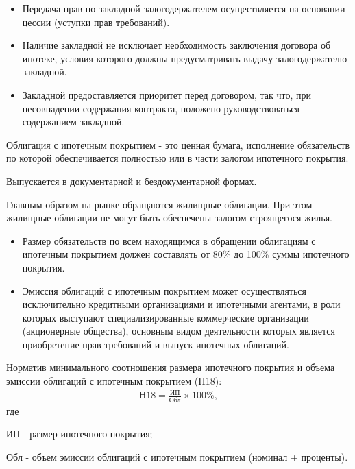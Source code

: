 \documentclass[_Banking_p2.tex]{subfiles}
\begin{document}
\begin{frame}
\begin{itemize}[<+->]
\item
Передача прав по закладной залогодержателем осуществляется на основании цессии (уступки прав требований). 

\item
Наличие закладной не исключает необходимость заключения договора об ипотеке, условия которого должны предусматривать выдачу залогодержателю закладной. 

\item
Закладной предоставляется приоритет перед договором, так что, при несовпадении содержания контракта, положено руководствоваться содержанием закладной.
\end{itemize}
\end{frame}

\begin{frame}{}
\begin{block}{Облигация с ипотечным покрытием }
\quad
- это ценная бумага, исполнение обязательств по которой обеспечивается полностью или в части залогом ипотечного покрытия. 

Выпускается в документарной и бездокументарной формах. 
\end{block}
Главным образом на рынке обращаются жилищные облигации. При этом жилищные облигации не могут быть обеспечены залогом строящегося жилья.
\end{frame}

\begin{frame}
\begin{itemize}[<+->]
\item
Размер обязательств по всем находящимся в обращении облигациям с ипотечным покрытием должен составлять от 80\% до 100\% суммы ипотечного покрытия.
\item
Эмиссия облигаций с ипотечным покрытием может осуществляться исключительно кредитными организациями и ипотечными агентами, в роли которых выступают специализированные коммерческие организации (акционерные общества), основным видом деятельности которых является приобретение прав требований и выпуск ипотечных облигаций. 
\end{itemize}
\end{frame}

\begin{frame}{}
Норматив минимального соотношения размера ипотечного покрытия и объема эмиссии облигаций с ипотечным покрытием (H18):
\begin{align}
\text{Н18}=\frac{\text{ИП}}{\text{Обл}}\times 100\%,
\end{align}
где

ИП - размер ипотечного покрытия;

Обл - объем эмиссии облигаций с ипотечным покрытием (номинал + проценты).

\end{frame}
\end{document}
